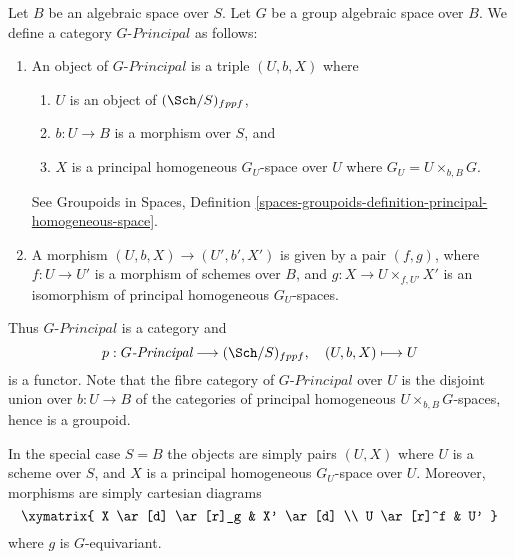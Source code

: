 \noindent
Let $B$ be an algebraic space over $S$.
Let $G$ be a group algebraic space over $B$.
We define a category $G\textit{-Principal}$ as follows:
\begin{enumerate}
\item An object of $G\textit{-Principal}$ is a triple $(U, b, X)$ where
\begin{enumerate}
\item $U$ is an object of $(\Sch/S)_{fppf}$,
\item $b : U \to B$ is a morphism over $S$, and
\item $X$ is a principal homogeneous $G_U$-space over $U$ where
$G_U = U \times_{b, B} G$.
\end{enumerate}
See
Groupoids in Spaces,
Definition \ref{spaces-groupoids-definition-principal-homogeneous-space}.
\item A morphism $(U, b, X) \to (U', b', X')$ is given
by a pair $(f, g)$, where $f : U \to U'$ is a morphism of schemes
over $B$, and $g : X \to U \times_{f, U'} X'$ is an
isomorphism of principal homogeneous $G_U$-spaces.
\end{enumerate}
Thus $G\textit{-Principal}$ is a category and
$$
p : G\textit{-Principal} \longrightarrow (\Sch/S)_{fppf},
\quad
(U, b, X) \longmapsto U
$$
is a functor. Note that the fibre category of $G\textit{-Principal}$
over $U$ is the disjoint union over $b : U \to B$
of the categories of principal homogeneous $U \times_{b, B} G$-spaces,
hence is a groupoid.

\medskip\noindent
In the special case $S = B$ the objects are simply pairs
$(U, X)$ where $U$ is a scheme over $S$, and $X$ is a principal homogeneous
$G_U$-space over $U$. Moreover, morphisms are simply cartesian
diagrams
$$
\xymatrix{
X \ar[d] \ar[r]_g & X' \ar[d] \\
U \ar[r]^f & U'
}
$$
where $g$ is $G$-equivariant.

